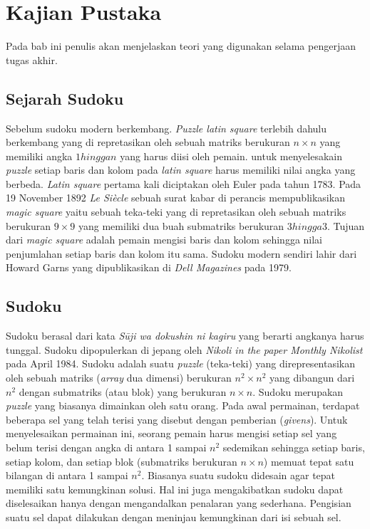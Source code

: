 \chapter{Kajian Pustaka}

Pada bab ini penulis akan menjelaskan teori yang digunakan selama pengerjaan tugas akhir.

\section{Sejarah Sudoku}

Sebelum sudoku modern berkembang. \textit{Puzzle latin square} terlebih dahulu berkembang yang di repretasikan oleh sebuah matriks berukuran ${n \times n}$ yang memiliki angka ${1 hingga n}$ yang harus diisi oleh pemain. untuk menyelesakain \textit{puzzle }setiap baris dan kolom pada \textit{latin square} harus memiliki nilai angka yang berbeda. \textit{Latin square} pertama kali diciptakan oleh Euler pada tahun 1783\cite{Unk1}. Pada 19 November 1892 \textit{ Le Siècle} sebuah surat kabar di perancis mempublikasikan \textit{magic square} yaitu sebuah teka-teki  yang di repretasikan oleh sebuah matriks berukuran ${9 \times 9}$ yang memiliki dua buah submatriks berukuran ${3 hingga 3}$. Tujuan dari \textit{magic square} adalah pemain mengisi baris dan kolom sehingga nilai penjumlahan setiap baris dan kolom itu sama. Sudoku modern sendiri lahir dari  Howard Garns yang dipublikasikan di \textit{Dell Magazines} pada 1979\cite{SATPy5}.	



\section{Sudoku}

Sudoku berasal dari kata \textit{Sūji wa dokushin ni kagiru} yang berarti angkanya harus tunggal\cite{SATPy3}. Sudoku dipopulerkan di jepang oleh \textit{Nikoli in the paper Monthly Nikolist} pada April 1984. Sudoku adalah suatu \textit{puzzle} (teka-teki) yang direpresentasikan oleh sebuah matriks (\textit{array}
dua dimensi) berukuran ${n^2 \times n^2}$  yang dibangun dari ${n^2}$ dengan submatriks (atau blok)
yang berukuran ${n \times n}$. Sudoku merupakan \textit{puzzle}
yang biasanya dimainkan oleh satu orang.  Pada
awal permainan, terdapat beberapa sel yang telah terisi yang disebut dengan pemberian
(\textit{givens}). Untuk menyelesaikan permainan ini, seorang pemain harus mengisi setiap sel yang
belum terisi dengan angka di antara 1 sampai
$n^2$ sedemikan sehingga setiap baris, setiap kolom,
dan setiap blok (submatriks berukuran $n \times n$) memuat tepat satu bilangan di antara 1 sampai $n^2$. Biasanya suatu sudoku didesain agar tepat memiliki satu kemungkinan solusi. Hal
ini juga mengakibatkan sudoku dapat diselesaikan hanya dengan mengandalkan penalaran
yang sederhana. Pengisian suatu sel dapat dilakukan dengan meninjau kemungkinan dari
isi sebuah sel.


